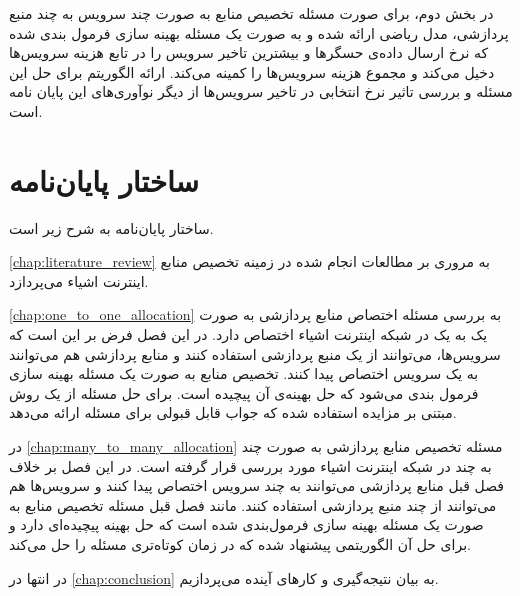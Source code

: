     در بخش دوم، برای صورت مسئله تخصیص منابع به صورت چند سرویس به چند منبع پردازشی، مدل ریاضی ارائه شده و به صورت یک مسئله بهینه سازی فرمول بندی شده که نرخ ارسال داده‌ی حسگر‌ها و بیشترین تاخیر سرویس را در تابع هزینه سرویس‌ها دخیل می‌کند و مجموع هزینه سرویس‌ها را کمینه می‌کند.
    ارائه الگوریتم برای حل این مسئله و بررسی تاثیر نرخ انتخابی در تاخیر سرویس‌ها از دیگر نو‌آوری‌های این پایان نامه است.

  \section{ساختار پایان‌نامه}
    ساختار پایان‌نامه به شرح زیر است.

    \cref{chap:literature_review} به مروری بر مطالعات انجام شده در زمینه تخصیص منابع اینترنت اشیاء می‌پردازد.

    \cref{chap:one_to_one_allocation} به بررسی مسئله اختصاص منابع پردازشی به صورت یک به یک در شبکه اینترنت اشیاء اختصاص دارد.
    در این فصل فرض بر این است که سرویس‌ها، می‌توانند از یک منبع پردازشی استفاده کنند و منابع پردازشی هم می‌توانند به یک سرویس اختصاص پیدا کنند.
    تخصیص منابع به صورت یک مسئله بهینه سازی فرمول بندی می‌شود که حل بهینه‌ی آن پیچیده است.
    برای حل مسئله از یک روش مبتنی بر مزایده استفاده شده که جواب قابل قبولی برای مسئله ارائه می‌دهد.

    در \cref{chap:many_to_many_allocation} مسئله تخصیص منابع پردازشی به صورت چند به چند در شبکه اینترنت اشیاء مورد بررسی قرار گرفته است.
    در این فصل بر خلاف فصل قبل منابع پردازشی می‌توانند به چند سرویس اختصاص پیدا کنند و سرویس‌ها هم می‌توانند از چند منبع پردازشی استفاده کنند.
    مانند فصل قبل مسئله تخصیص منابع به صورت یک مسئله بهینه سازی فرمول‌بندی شده است که حل بهینه پیچیده‌ای دارد و برای حل آن الگوریتمی پیشنهاد شده که در زمان کوتاه‌تری مسئله را حل می‌کند.

    در انتها در \cref{chap:conclusion} به بیان نتیجه‌گیری و کار‌های آینده می‌پردازیم.
